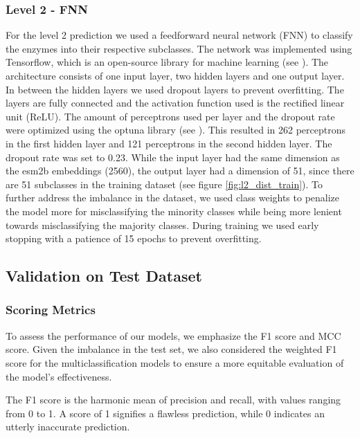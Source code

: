 \documentclass{bioinfo}
\begin{document}
\begin{methods}
\subsubsection{Level 2 - FNN}
For the level 2 prediction we used a feedforward neural network (FNN) to classify the enzymes into their respective subclasses.
The network was implemented using Tensorflow, which is an open-source library for machine learning (see \cite{tensorflow2015-whitepaper}).
The architecture consists of one input layer, two hidden layers and one output layer.
In between the hidden layers we used dropout layers to prevent overfitting.
The layers are fully connected and the activation function used is the rectified linear unit (ReLU).
The amount of perceptrons used per layer and the dropout rate were optimized using the optuna library (see \cite{optuna_2019}).
This resulted in 262 perceptrons in the first hidden layer and 121 perceptrons in the second hidden layer.
The dropout rate was set to 0.23.
While the input layer had the same dimension as the esm2b embeddings (2560), the output layer had a dimension of 51,
since there are 51 subclasses in the training dataset (see figure \ref{fig:l2_dist_train}).
To further address the imbalance in the dataset, we used class weights to penalize the model more for misclassifying the minority classes
while being more lenient towards misclassifying the majority classes.
During training we used early stopping with a patience of 15 epochs to prevent overfitting.


\subsection{Validation on Test Dataset}

\subsubsection{Scoring Metrics}

To assess the performance of our models, we emphasize the F1 score and MCC score. 
Given the imbalance in the test set, we also considered the weighted F1 score for the multiclassification models
to ensure a more equitable evaluation of the model's effectiveness.

The F1 score is the harmonic mean of precision and recall, with values ranging from 0 to 1.
A score of 1 signifies a flawless prediction, while 0 indicates an utterly inaccurate prediction.


\end{methods}
\end{document}
